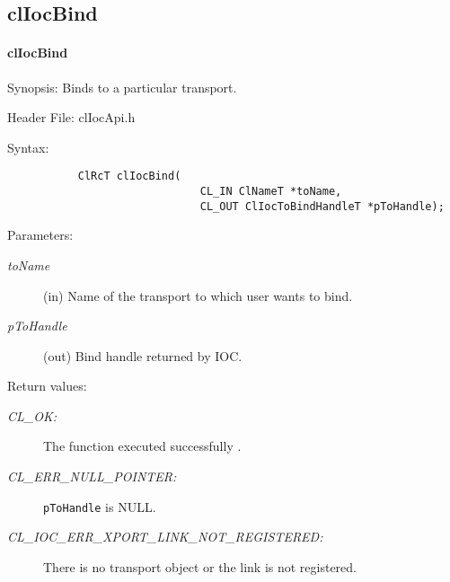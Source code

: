 \begin{flushleft}
\subsection{clIocBind}
\hypertarget{pageioc139}{}\paragraph{cl\-Ioc\-Bind}\label{pageioc139}
\begin{Desc}
\item[Synopsis:]Binds to a particular transport.\end{Desc}
\begin{Desc}
\item[Header File:]clIocApi.h\end{Desc}
\begin{Desc}
\item[Syntax:]

\footnotesize\begin{verbatim}           ClRcT clIocBind(
					          CL_IN ClNameT *toName,
					          CL_OUT ClIocToBindHandleT *pToHandle);
\end{verbatim}
\normalsize
\end{Desc}
\begin{Desc}
\item[Parameters:]
\begin{description}
\item[{\em to\-Name}](in) Name of the transport to which user wants to bind.
\item[{\em p\-To\-Handle}](out) Bind handle returned by IOC.
\end{description}
\end{Desc}
\begin{Desc}
\item[Return values:]
\begin{description}
\item[{\em CL\_\-OK:}]The function executed successfully .
\item[{\em CL\_\-ERR\_\-NULL\_\-POINTER:}]{\tt{pToHandle}} is NULL.
\item[{\em CL\_\-IOC\_\-ERR\_\-XPORT\_\-LINK\_\-NOT\_\-REGISTERED:}]There is no transport object or the link is not registered.


\end{description}
\end{Desc}
\end{flushleft}
